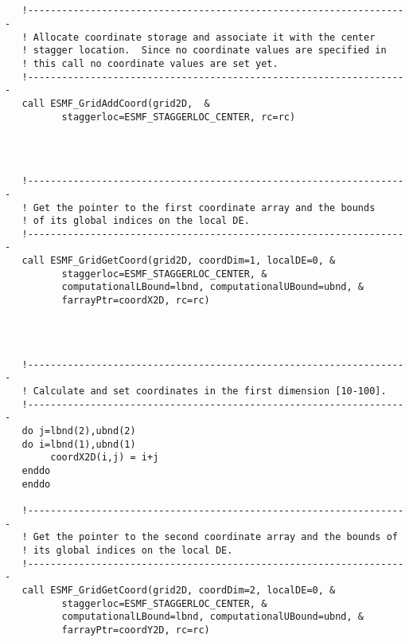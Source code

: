  \begin{verbatim}


   !-------------------------------------------------------------------
   ! Allocate coordinate storage and associate it with the center
   ! stagger location.  Since no coordinate values are specified in
   ! this call no coordinate values are set yet.
   !-------------------------------------------------------------------
   call ESMF_GridAddCoord(grid2D,  &
          staggerloc=ESMF_STAGGERLOC_CENTER, rc=rc)
 
\end{verbatim}
 

 \begin{verbatim}


   !-------------------------------------------------------------------
   ! Get the pointer to the first coordinate array and the bounds
   ! of its global indices on the local DE.
   !-------------------------------------------------------------------
   call ESMF_GridGetCoord(grid2D, coordDim=1, localDE=0, &
          staggerloc=ESMF_STAGGERLOC_CENTER, &
          computationalLBound=lbnd, computationalUBound=ubnd, &
          farrayPtr=coordX2D, rc=rc)
 
\end{verbatim}
 

 \begin{verbatim}


   !-------------------------------------------------------------------
   ! Calculate and set coordinates in the first dimension [10-100].
   !-------------------------------------------------------------------
   do j=lbnd(2),ubnd(2)
   do i=lbnd(1),ubnd(1)
        coordX2D(i,j) = i+j
   enddo
   enddo

   !-------------------------------------------------------------------
   ! Get the pointer to the second coordinate array and the bounds of
   ! its global indices on the local DE.
   !-------------------------------------------------------------------
   call ESMF_GridGetCoord(grid2D, coordDim=2, localDE=0, &
          staggerloc=ESMF_STAGGERLOC_CENTER, &
          computationalLBound=lbnd, computationalUBound=ubnd, &
          farrayPtr=coordY2D, rc=rc)
 
\end{verbatim}
 

